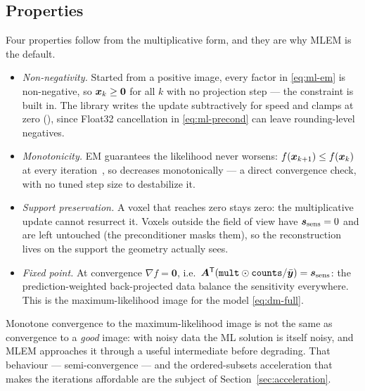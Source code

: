 \subsection{Properties}
\label{sec:mlem:properties}

Four properties follow from the multiplicative form, and they are why MLEM is the
default.

\begin{itemize}
  \item \emph{Non-negativity.} Started from a positive image, every factor in
        \eqref{eq:ml-em} is non-negative, so $\bm{x}_k\ge\bm0$ for all $k$ with no
        projection step --- the constraint is built in. The library writes the
        update subtractively for speed and clamps at zero
        (), since Float32 cancellation in
        \eqref{eq:ml-precond} can leave rounding-level negatives.
  \item \emph{Monotonicity.} EM guarantees the likelihood never worsens:
        $f(\bm{x}_{k+1})\le f(\bm{x}_k)$ at every iteration~\cite{lange1984}, so
         decreases monotonically --- a direct
        convergence check, with no tuned step size to destabilize it.
  \item \emph{Support preservation.} A voxel that reaches zero stays zero: the
        multiplicative update cannot resurrect it. Voxels outside the field of
        view have $\bm{s}_{\mathrm{sens}}=0$ and are left untouched (the preconditioner masks
        them), so the reconstruction lives on the support the geometry actually
        sees.
  \item \emph{Fixed point.} At convergence $\nabla f=\bm0$, i.e.\
        $\bm{A}^{\mathsf{T}}(\texttt{mult}\odot\texttt{counts}/\bar{\bm{y}})=\bm{s}_{\mathrm{sens}}$: the
        prediction-weighted back-projected data balance the sensitivity
        everywhere. This is the maximum-likelihood image for the model
        \eqref{eq:dm-full}.
\end{itemize}

\noindent
Monotone convergence to the maximum-likelihood image is not the same as
convergence to a \emph{good} image: with noisy data the ML solution is itself
noisy, and MLEM approaches it through a useful intermediate before degrading.
That behaviour --- semi-convergence --- and the ordered-subsets acceleration that
makes the iterations affordable are the subject of Section~\ref{sec:acceleration}.

